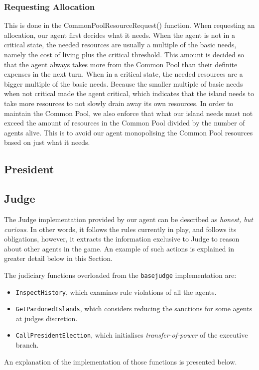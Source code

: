 \subsubsection{Requesting Allocation}\label{subsubsection:CommonPoolResourceRequest()}
This is done in the CommonPoolResourceRequest() function. When requesting an allocation, our agent first decides what it needs. When the agent is not in a critical state, the needed resources are usually a multiple of the basic needs, namely the cost of living plus the critical threshold. This amount is decided so that the agent always takes more from the Common Pool than their definite expenses in the next turn. When in a critical state, the needed resources are a bigger multiple of the basic needs. Because the smaller multiple of basic needs when not critical made the agent critical, which indicates that the island needs to take more resources to not slowly drain away its own resources. In order to maintain the Common Pool, we also enforce that what our island needs must not exceed the amount of resources in the Common Pool divided by the number of agents alive. This is to avoid our agent monopolising the Common Pool resources based on just what it needs.

\subsection{President}


\subsection{Judge}
\label{subsec:team4:judge}
The Judge implementation provided by our agent can be described as \emph{honest, but curious}. In other words, it follows the rules currently in play, and follows its obligations, however, it extracts the information exclusive to Judge to reason about other agents in the game. An example of such actions is explained in greater detail below in this Section.

The judiciary functions overloaded from the \texttt{basejudge} implementation are:
\begin{itemize}
    \item \texttt{InspectHistory}, which examines rule violations of all the agents.
    \item \texttt{GetPardonedIslands}, which considers reducing the sanctions for some agents at judges discretion.
    \item \texttt{CallPresidentElection}, which initialises \emph{transfer-of-power} of the executive branch.
\end{itemize}
An explanation of the implementation of those functions is presented below.

